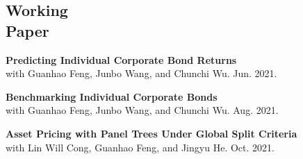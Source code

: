 \documentclass[margin]{res}
\begin{document}
\begin{resume}
\vspace{5mm}

\section{\sc Working \\ Paper}

\textbf{Predicting Individual Corporate Bond Returns \\}
with Guanhao Feng, Junbo Wang, and Chunchi Wu. Jun. 2021.

\textbf{Benchmarking Individual Corporate Bonds \\}
with Guanhao Feng, Junbo Wang, and Chunchi Wu.  Aug. 2021.

\textbf{Asset Pricing with Panel Trees Under Global Split Criteria \\}
with Lin Will Cong, Guanhao Feng, and Jingyu He. Oct. 2021. 

\vspace{5mm}








\end{resume}
\end{document}
